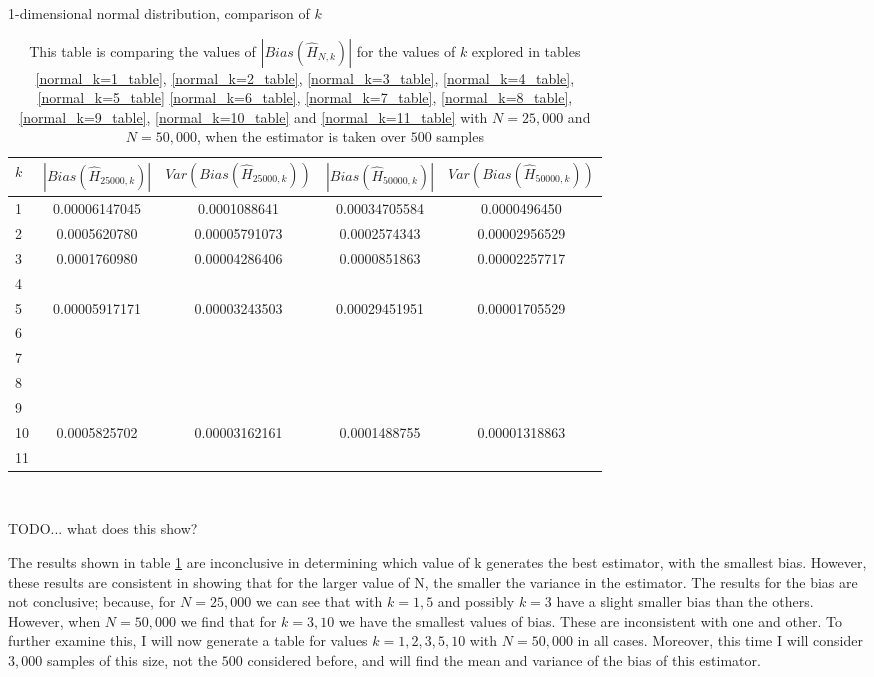\documentclass{report}
\begin{document}
\begin{table}
\caption{1-dimensional normal distribution, comparison of $k$} \label{normal_kcompare_table}
\begin{center}
\begin{tabular}{| l | c c c c|} 
\toprule
$k$ & $|Bias(\hat{H}_{25000, k})|$ & $Var(Bias(\hat{H}_{25000, k}))$ & $|Bias(\hat{H}_{50000, k})|$ & $Var(Bias(\hat{H}_{50000, k}) )$ \\
\midrule[1pt]
1    & 0.00006147045   & 0.0001088641     & 0.00034705584   & 0.0000496450   \\
2    & 0.0005620780     & 0.00005791073   & 0.0002574343     & 0.00002956529 \\
3    & 0.0001760980     & 0.00004286406   & 0.0000851863     & 0.00002257717 \\
4    &   &   &   &   \\
5    & 0.00005917171   & 0.00003243503   & 0.00029451951   & 0.00001705529 \\
6    &   &   &   &   \\
7    &   &   &   &   \\
8    &   &   &   &   \\
9    &   &   &   &   \\
10  & 0.0005825702     & 0.00003162161   & 0.0001488755     & 0.00001318863 \\
11  &   &   &   &   \\
\hline
\end{tabular}
\\[10pt]
\caption*{This table is comparing the values of $|Bias(\hat{H}_{N, k})|$ for the values of $k$ explored in tables \ref{normal_k=1_table}, \ref{normal_k=2_table}, \ref{normal_k=3_table}, \ref{normal_k=4_table}, \ref{normal_k=5_table}  \ref{normal_k=6_table}, \ref{normal_k=7_table}, \ref{normal_k=8_table}, \ref{normal_k=9_table}, \ref{normal_k=10_table} and  \ref{normal_k=11_table} with $N=25,000$ and $N=50,000$, when the estimator is taken over $500$ samples}
\end{center}
\end{table}

TODO... what does this show?

The results shown in table \ref{normal_kcompare_table} are inconclusive in determining which value of k generates the best estimator, with the smallest bias. However, these results are consistent in showing that for the larger value of N, the smaller the variance in the estimator. The results for the bias are not conclusive; because, for $N=25,000$ we can see that with $k=1, 5$ and possibly $k=3$ have a slight smaller bias than the others. However, when $N=50,000$ we find that for $k=3, 10$ we have the smallest values of bias. These are inconsistent with one and other. To further examine this, I will now generate a table for values $k=1, 2, 3, 5, 10$ with $N=50,000$ in all cases. Moreover, this time I will consider $3,000$ samples of this size, not the $500$ considered before, and will find the mean and variance of the bias of this estimator.
\end{document}
